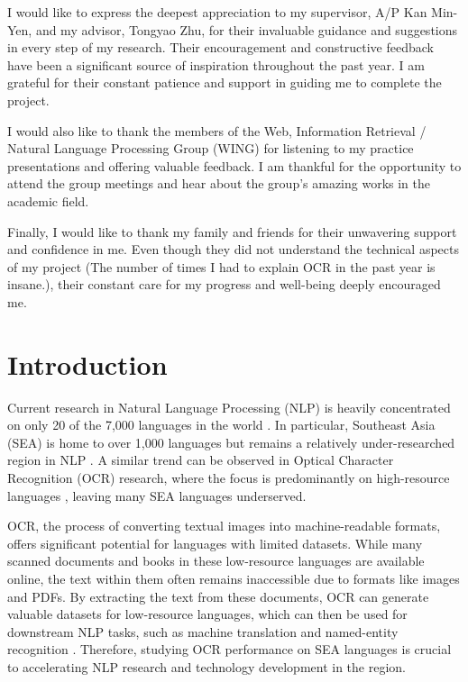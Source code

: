 \documentclass[12pt,oneside]{memoir}
\begin{document}
I would like to express the deepest appreciation to my supervisor, A/P Kan Min-Yen, and my advisor, Tongyao Zhu, for their invaluable guidance and suggestions in every step of my research. 
Their encouragement and constructive feedback have been a significant source of inspiration throughout the past year.
I am grateful for their constant patience and support in guiding me to complete the project.

I would also like to thank the members of the Web, Information Retrieval / Natural Language Processing Group (WING) for listening to my practice presentations and offering valuable feedback. 
I am thankful for the opportunity to attend the group meetings and hear about the group's amazing works in the academic field.

Finally, I would like to thank my family and friends for their unwavering support and confidence in me.
Even though they did not understand the technical aspects of my project (The number of times I had to explain OCR in the past year is insane.), their constant care for my progress and well-being deeply encouraged me.

\listoffigures
\listoftables
\tableofcontents

\mainmatter

\chapter{Introduction}
Current research in Natural Language Processing (NLP) is heavily concentrated on only 20 of the 7,000 languages in the world \parencite{magueresse-etal-2020}.
In particular, Southeast Asia (SEA) is home to over 1,000 languages but remains a relatively under-researched region in NLP \parencite{aji-etal-2023}.
A similar trend can be observed in Optical Character Recognition (OCR) research, where the focus is predominantly on high-resource languages \parencite{salehudin-etal-2023, smith-2007}, leaving many SEA languages underserved.

OCR, the process of converting textual images into machine-readable formats, offers significant potential for languages with limited datasets. While many scanned documents and books in these low-resource languages are available online, the text within them often remains inaccessible due to formats like images and PDFs. By extracting the text from these documents, OCR can generate valuable datasets for low-resource languages, which can then be used for downstream NLP tasks, such as machine translation and named-entity recognition \parencite{agarwal-and-anastasopoulos-2024, ignat-etal-2022}.
Therefore, studying OCR performance on SEA languages is crucial to accelerating NLP research and technology development in the region.
\end{document}
